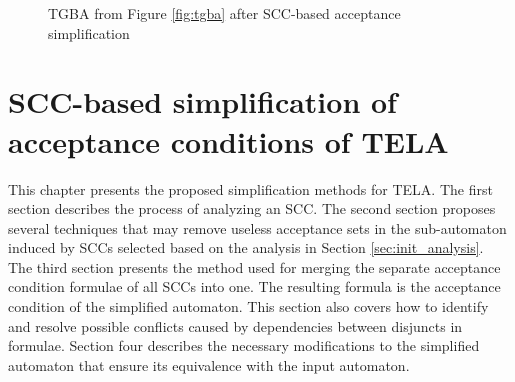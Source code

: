 \documentclass[
  digital, %
  twoside, %
  table,   %
  lof,     %
  lot,     %
]{fithesis3}
\begin{document}
\begin{figure}[h]
    \begin{center}
    \caption{TGBA from Figure \ref{fig:tgba} after SCC-based acceptance simplification}
    \label{fig:simpl_tgba}
  \end{center}
\end{figure}


\chapter{SCC-based simplification of acceptance conditions of TELA}
\label{chap:simpl_tela}
This chapter presents the proposed simplification methods for TELA. The first section describes the process of analyzing an SCC. The second section proposes several techniques that may remove useless acceptance sets in the sub-automaton induced by SCCs selected based on the analysis in Section \ref{sec:init_analysis}. The third section presents the method used for merging the separate acceptance condition formulae of all SCCs into one. The resulting formula is the acceptance condition of the simplified automaton. This section also covers how to identify and resolve possible conflicts caused by dependencies between disjuncts in formulae. Section four describes the necessary modifications to the simplified automaton that ensure its equivalence with the input automaton. 
\end{document}
